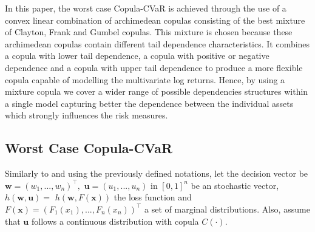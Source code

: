 \documentclass[a4paper,10pt]{article}
\begin{document}
In this paper, the worst case Copula-CVaR is achieved through the use of a
convex linear combination of archimedean copulas consisting of the best
mixture of Clayton, Frank and Gumbel copulas. This mixture is chosen because
these archimedean copulas contain different tail dependence characteristics.
It combines a copula with lower tail dependence, a copula with positive or
negative dependence and a copula with upper tail dependence to produce a
more flexible copula capable of modelling the multivariate log returns.
Hence, by using a mixture copula we cover a wider range of possible
dependencies structures within a single model capturing better the
dependence between the individual assets which strongly influences the risk
measures.

\subsection{Worst Case Copula-CVaR}

Similarly to \citet*{kakouris14} and using the previously defined notations,
let the decision vector be $\mathbf{w=}\left( w_{1},...,w_{n}\right) ^{\top
},$ $\mathbf{u}=\left( u_{1},...,u_{n}\right) $ in $[0,1]^{n}$ be an
stochastic vector, $h\left( \mathbf{w,u}\right) =$ $h\left( \mathbf{w,}%
F\left( \mathbf{x}\right) \right) $ the loss function and $F\left( \mathbf{x}%
\right) =\left( F_{1}\left( x_{1}\right) ,...,F_{n}\left( x_{n}\right)
\right) ^{\top }$ a set of marginal distributions. Also, assume that $\mathbf{u}$ follows a continuous
distribution with copula $C\left( \cdot \right) $.

\bigskip
\end{document}

